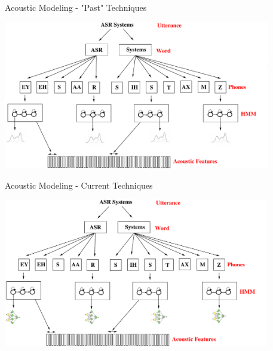 \begin{frame}{Acoustic Modeling - "Past" Techniques}
\begin{center}
\includegraphics[height=65mm]{figures/am-gmm}
\end{center}
\end{frame}

\begin{frame}{Acoustic Modeling - Current Techniques}
\begin{center}
\includegraphics[height=65mm]{figures/am-mlp}
\end{center}
\end{frame}

